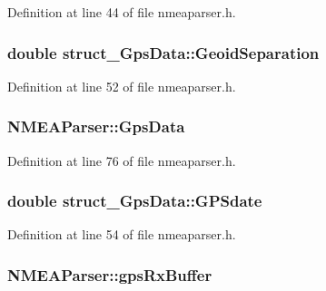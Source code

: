\-Definition at line 44 of file nmeaparser.\-h.

\hypertarget{group___g_p_s_gadget_plugin_ga847e7e6776a9a2cdaf8c4cf0ce8e31ae}{
\subsubsection[{\-Geoid\-Separation}]{\setlength{\rightskip}{0pt plus 5cm}double {\bf struct\-\_\-\-Gps\-Data\-::\-Geoid\-Separation}}}\label{group___g_p_s_gadget_plugin_ga847e7e6776a9a2cdaf8c4cf0ce8e31ae}


\-Definition at line 52 of file nmeaparser.\-h.

\hypertarget{group___g_p_s_gadget_plugin_ga5ed5a691ba188edd73dbfa5e6a72ee31}{
\subsubsection[{\-Gps\-Data}]{ {\bf \-N\-M\-E\-A\-Parser\-::\-Gps\-Data}}}\label{group___g_p_s_gadget_plugin_ga5ed5a691ba188edd73dbfa5e6a72ee31}


\-Definition at line 76 of file nmeaparser.\-h.

\hypertarget{group___g_p_s_gadget_plugin_ga5556ea2f7e4f0fb213a319e72a5961eb}{
\subsubsection[{\-G\-P\-Sdate}]{\setlength{\rightskip}{0pt plus 5cm}double {\bf struct\-\_\-\-Gps\-Data\-::\-G\-P\-Sdate}}}\label{group___g_p_s_gadget_plugin_ga5556ea2f7e4f0fb213a319e72a5961eb}


\-Definition at line 54 of file nmeaparser.\-h.

\hypertarget{group___g_p_s_gadget_plugin_gae55785b07246236cfe8d6c3139becff1}{
\subsubsection[{gps\-Rx\-Buffer}]{ {\bf \-N\-M\-E\-A\-Parser\-::gps\-Rx\-Buffer}}}\label{group___g_p_s_gadget_plugin_gae55785b07246236cfe8d6c3139becff1}


